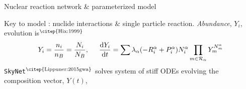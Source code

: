 
\begin{frame}{Nuclear reaction network \& parameterized model}

    Key to model \nuc{}: nuclide interactions \& single particle reaction. %
    \textit{Abundance}, $Y_i$, evolution is$^{\text{\citep{Hix:1999}}}$
    \begin{equation*}
    Y_i = \frac{n_i}{n_B} = \frac{N_i}{N_B}, \hspace{5mm}
    \frac{\text{d}Y_i}{\text{d}t} = \sum\lambda_{\alpha}(-R_{i}^{\alpha}+P_{i}^{\alpha})N_{i}^{\alpha}\prod_{m\in\mathcal{R}_{\alpha}}Y_m^{N_{m}^{\alpha}}
    \end{equation*}
    \texttt{SkyNet}$^{\text{\citep{Lippuner:2015gwa}}}$ solves 
    system of stiff \acp{ODE} %
    evolving the composition vector, $Y(t)$, %
    

\end{frame}
